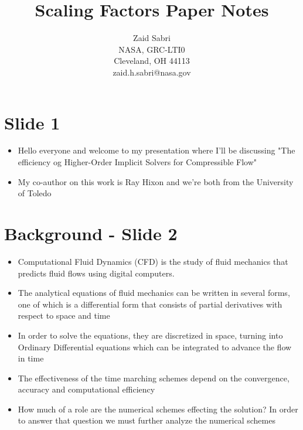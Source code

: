 \documentclass[a4paper,17pt]{extarticle}
\begin{document}
\begin{titlepage}
\title{Scaling Factors Paper Notes
}

\author{
Zaid Sabri \\
NASA, GRC-LTI0 \\
Cleveland, OH  44113 \\
zaid.h.sabri@nasa.gov }

\maketitle
\end{titlepage}

\pagebreak \section*{Slide 1}
\begin{itemize}
   \item Hello everyone and welcome to my presentation where I'll be discussing "The efficiency og
      Higher-Order Implicit Solvers for Compressible Flow"
   \item My co-author on this work is Ray Hixon and we're both from the University of Toledo
\end{itemize}

\pagebreak \section*{Background - Slide 2}
\begin{itemize}
   \item Computational Fluid Dynamics (CFD) is the study of fluid mechanics that predicts fluid
      flows using digital computers.
   \item The analytical equations of fluid mechanics can be written in several forms, one of which
      is a differential form that consists of partial derivatives with respect to space and time
   \item In order to solve the equations, they are discretized in space, turning into Ordinary
      Differential equations which can be integrated to advance the flow in time
   \item The effectiveness of the time marching schemes depend on the convergence, accuracy and
      computational efficiency
   \item How much of a role are the numerical schemes effecting the solution? In order to answer
      that question we must further analyze the numerical schemes
\end{itemize}
\end{document}
